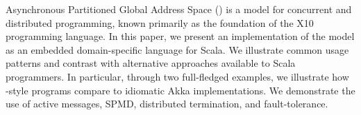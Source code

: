 Asynchronous Partitioned Global Address Space (\apgas) is a model for
concurrent and distributed programming, known primarily as the foundation of
the X10 programming language. In this paper, we present an implementation of
the model as an embedded domain-specific language for Scala. We illustrate
common usage patterns and contrast with alternative approaches available to
Scala programmers. In particular, through two full-fledged examples, we
illustrate how \apgas-style programs compare to idiomatic Akka implementations.
We demonstrate the use of active messages, SPMD, distributed termination, and
fault-tolerance.

